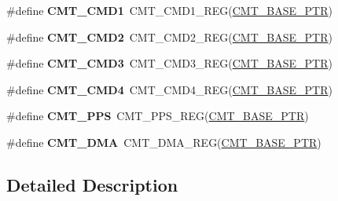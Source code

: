 \begin{DoxyCompactItemize}
\item 
\hypertarget{group___c_m_t___register___accessor___macros_ga2d816daa348fd72efabe968a53dd3519}{}\#define {\bfseries C\+M\+T\+\_\+\+C\+M\+D1}~C\+M\+T\+\_\+\+C\+M\+D1\+\_\+\+R\+E\+G(\hyperlink{group___c_m_t___peripheral_gae361f199741d5276c4618edb9ee289b7}{C\+M\+T\+\_\+\+B\+A\+S\+E\+\_\+\+P\+T\+R})\label{group___c_m_t___register___accessor___macros_ga2d816daa348fd72efabe968a53dd3519}

\item 
\hypertarget{group___c_m_t___register___accessor___macros_ga82b6cc872f8618c5af1c34c62229a3a3}{}\#define {\bfseries C\+M\+T\+\_\+\+C\+M\+D2}~C\+M\+T\+\_\+\+C\+M\+D2\+\_\+\+R\+E\+G(\hyperlink{group___c_m_t___peripheral_gae361f199741d5276c4618edb9ee289b7}{C\+M\+T\+\_\+\+B\+A\+S\+E\+\_\+\+P\+T\+R})\label{group___c_m_t___register___accessor___macros_ga82b6cc872f8618c5af1c34c62229a3a3}

\item 
\hypertarget{group___c_m_t___register___accessor___macros_gaf97d4508ec487dc63e244938dbcb88ae}{}\#define {\bfseries C\+M\+T\+\_\+\+C\+M\+D3}~C\+M\+T\+\_\+\+C\+M\+D3\+\_\+\+R\+E\+G(\hyperlink{group___c_m_t___peripheral_gae361f199741d5276c4618edb9ee289b7}{C\+M\+T\+\_\+\+B\+A\+S\+E\+\_\+\+P\+T\+R})\label{group___c_m_t___register___accessor___macros_gaf97d4508ec487dc63e244938dbcb88ae}

\item 
\hypertarget{group___c_m_t___register___accessor___macros_ga17049df9c1f0cc2fc3a0bdfbdb6f6bc1}{}\#define {\bfseries C\+M\+T\+\_\+\+C\+M\+D4}~C\+M\+T\+\_\+\+C\+M\+D4\+\_\+\+R\+E\+G(\hyperlink{group___c_m_t___peripheral_gae361f199741d5276c4618edb9ee289b7}{C\+M\+T\+\_\+\+B\+A\+S\+E\+\_\+\+P\+T\+R})\label{group___c_m_t___register___accessor___macros_ga17049df9c1f0cc2fc3a0bdfbdb6f6bc1}

\item 
\hypertarget{group___c_m_t___register___accessor___macros_ga078edfcdbd55827db79dda05e1404c14}{}\#define {\bfseries C\+M\+T\+\_\+\+P\+P\+S}~C\+M\+T\+\_\+\+P\+P\+S\+\_\+\+R\+E\+G(\hyperlink{group___c_m_t___peripheral_gae361f199741d5276c4618edb9ee289b7}{C\+M\+T\+\_\+\+B\+A\+S\+E\+\_\+\+P\+T\+R})\label{group___c_m_t___register___accessor___macros_ga078edfcdbd55827db79dda05e1404c14}

\item 
\hypertarget{group___c_m_t___register___accessor___macros_gadaf0785d5239674d6b363584b8d44c4c}{}\#define {\bfseries C\+M\+T\+\_\+\+D\+M\+A}~C\+M\+T\+\_\+\+D\+M\+A\+\_\+\+R\+E\+G(\hyperlink{group___c_m_t___peripheral_gae361f199741d5276c4618edb9ee289b7}{C\+M\+T\+\_\+\+B\+A\+S\+E\+\_\+\+P\+T\+R})\label{group___c_m_t___register___accessor___macros_gadaf0785d5239674d6b363584b8d44c4c}

\end{DoxyCompactItemize}


\subsection{Detailed Description}
